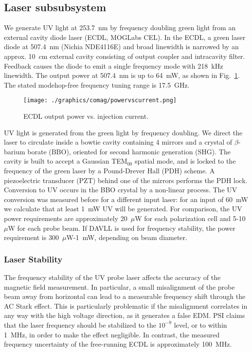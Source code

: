 \documentclass[11pt]{article}
\begin{document}
\subsection{Laser subsubsystem}
We generate UV light at 253.7~nm by frequency doubling green light from an external cavity diode laser (ECDL, MOGLabs CEL).  In the ECDL, a green laser diode at 507.4~nm (Nichia NDE4116E) and broad linewidth is narrowed by an approx. 10~cm external cavity consisting of output coupler and intracavity filter.  Feedback causes the diode to emit a single frequency mode with 218~kHz linewidth.  The output power at 507.4~nm is up to 64~mW, as shown in  Fig.~\ref{fig:power_vs_current}.  The stated modehop-free frequency tuning range is 17.5~GHz.

\begin{figure}[ht]
\begin{center}
\texttt{[image: ./graphics/comag/powervscurrent.png]}
\caption{ECDL output power vs. injection current.}
\label{fig:power_vs_current}
\end{center}
\end{figure}

UV light is generated from the green light by frequency doubling.  We direct the laser to circulate inside a bowtie cavity containing 4 mirrors and a crystal of $\beta$-barium borate (BBO), oriented for second harmonic generation (SHG).  The cavity is built to accept a Gaussian TEM$_{00}$ spatial mode, and is locked to the frequency of the green laser by a Pound-Drever Hall (PDH) scheme.  A piezoelectric transducer (PZT) behind one of the mirrors performs the PDH lock.  Conversion to UV occurs in the BBO crystal by a non-linear process.  The UV conversion was measured before for a different input laser: for an input of 60~mW we calculate that at least 1~mW UV will be generated.  For comparison, the UV power requirements are approximately 20~$\mu$W for each polarization cell and 5-10~$\mu$W for each probe beam.  If DAVLL is used for frequency stability, the power requirement is 300~$\mu$W-1~mW, depending on beam diameter.


\subsubsection{Laser Stability}
The frequency stability of the UV probe laser affects the accuracy of the magnetic field measurement.  In particular, a small misalignment of the probe beam away from horizontal can lead to a measurable frequency shift through the AC Stark effect.  This is particularly problematic if the misalignment correlates in any way with the high voltage direction, as it generates a false EDM.  PSI claims \cite{Fertl2013} that the laser frequency should be stabilized to the $10^{-9}$ level, or to within 1~MHz, in order to make the effect negligible.  In contrast, the measured frequency uncertainty of the free-running ECDL is approximately 100~MHz.
\end{document}
